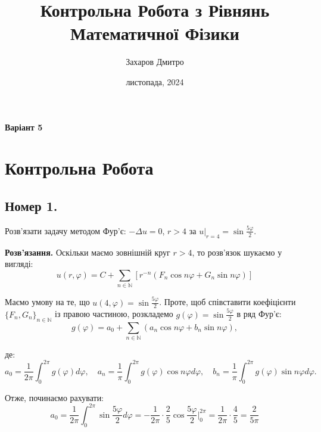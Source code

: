 \documentclass{hw_template}
\title{\huge\sffamily\bfseries Контрольна Робота з Рівнянь Математичної Фізики}
\author{\Large\sffamily Захаров Дмитро}
\date{\sffamily 26 листопада, 2024}
\begin{document}
\pagestyle{fancy}

\maketitle

\begin{center}
    \textbf{Варіант 5}
\end{center}

\tableofcontents

\pagebreak

\section{Контрольна Робота}

\subsection{Номер 1.}

\begin{problem}
    Розв'язати задачу методом Фур'є: $-\Delta u = 0$, $r>4$ за $u\Big|_{r=4}=\sin \frac{5\varphi}{2}$.
\end{problem}

\textbf{Розв'язання.} Оскільки маємо зовнішній круг $r>4$, то розв'язок шукаємо у вигляді:
\begin{equation*}
    u(r,\varphi) = C + \sum_{n \in \mathbb{N}} \left[r^{-n}(F_n \cos n\varphi + G_n \sin n\varphi)\right]
\end{equation*}

Маємо умову на те, що $u(4,\varphi) = \sin \frac{5\varphi}{2}$. Проте, щоб співставити 
коефіцієнти $\{F_n,G_n\}_{n \in \mathbb{N}}$ із правою частиною, розкладемо $g(\varphi) = \sin \frac{5\varphi}{2}$ 
в ряд Фур'є:
\begin{equation*}
    g(\varphi) = a_0 + \sum_{n \in \mathbb{N}}(a_n \cos n\varphi + b_n \sin n\varphi),
\end{equation*}

де:
\begin{equation*}
    a_0 = \frac{1}{2\pi}\int_{0}^{2\pi}g(\varphi)d\varphi, \quad a_n = \frac{1}{\pi}\int_{0}^{2\pi}g(\varphi)\cos n\varphi d\varphi, \quad b_n = \frac{1}{\pi}\int_{0}^{2\pi}g(\varphi)\sin n\varphi d\varphi.
\end{equation*}

Отже, починаємо рахувати:
\begin{equation*}
    a_0 = \frac{1}{2\pi}\int_{0}^{2\pi}\sin \frac{5\varphi}{2}d\varphi = -\frac{1}{2\pi} \cdot \frac{2}{5}\cos \frac{5\varphi}{2}\Big|_{0}^{2\pi} = \frac{1}{2\pi} \cdot \frac{4}{5} = \frac{2}{5\pi}
\end{equation*}
\end{document}
